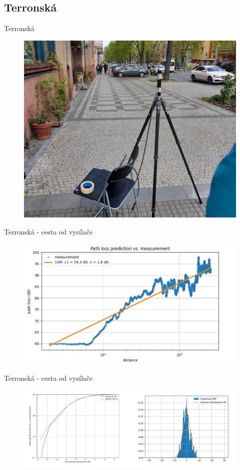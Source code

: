 \documentclass[aspectratio=169, 12pt, hyperref={unicode}]{beamer}
\begin{document}
\subsection{Terronská}
\begin{frame}{Terronská}
	\begin{figure}[!ht]
		\centering
		\includegraphics[angle=0,width=.5\textwidth]{src/fotka-terronska.jpg}
	\end{figure}
\end{frame}
\begin{frame}{Terronská - cesta od vysílače}
	\begin{figure}[!ht]
		\centering
		\includegraphics[width=.75\textwidth]{src/terronska-od-vysilace-1.png}
	\end{figure}
\end{frame}
\begin{frame}{Terronská - cesta od vysílače}
	\begin{figure}[!ht]
		\centering
		\includegraphics[width=.95\textwidth]{src/terronska-od-vysilace-2.png}
	\end{figure}
\end{frame}
\end{document}
